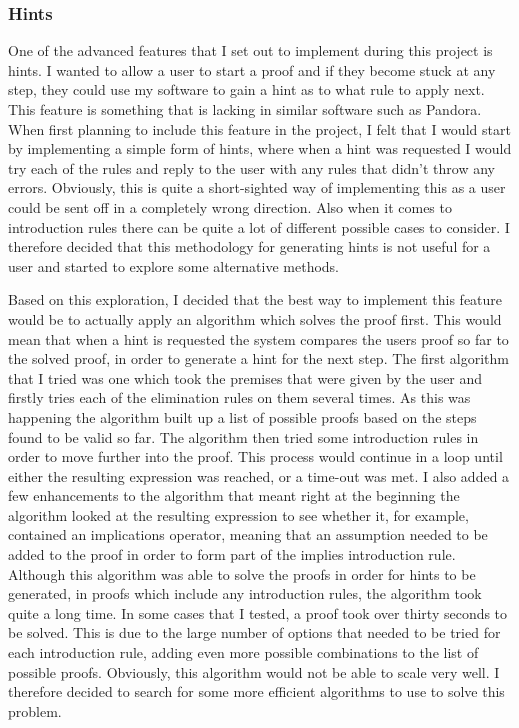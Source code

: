 \subsubsection{Hints \label{hints}}

One of the advanced features that I set out to implement during this project is hints. I wanted to allow a user to start a proof and if they become stuck at any step, they could use my software to gain a hint as to what rule to apply next. This feature is something that is lacking in similar software such as Pandora. When first planning to include this feature in the project,  I felt that I would start by implementing a simple form of hints, where when a hint was requested I would try each of the rules and reply to the user with any rules that didn't throw any errors. Obviously, this is quite a short-sighted way of implementing this as a user could be sent off in a completely wrong direction. Also when it comes to introduction rules there can be quite a lot of different possible cases to consider. I therefore decided that this methodology for generating hints is not useful for a user and started to explore some alternative methods.

Based on this exploration, I decided that the best way to implement this feature would be to actually apply an algorithm which solves the proof first. This would mean that when a hint is requested the system compares the users proof so far to the solved proof, in order to generate a hint for the next step. The first algorithm that I tried was one which took the premises that were given by the user and firstly tries each of the elimination rules on them several times. As this was happening the algorithm built up a list of possible proofs based on the steps found to be valid so far. The algorithm then tried some introduction rules in order to move further into the proof. This process would continue in a loop until either the resulting expression was reached, or a time-out was met. I also added a few enhancements to the algorithm that meant right at the beginning the algorithm looked at the resulting expression to see whether it, for example, contained an implications operator, meaning that an assumption needed to be added to the proof in order to form part of the implies introduction rule. Although this algorithm was able to solve the proofs in order for hints to be generated, in proofs which include any introduction rules, the algorithm took quite a long time. In some cases that I tested, a proof took over thirty seconds to be solved. This is due to the large number of options that needed to be tried for each introduction rule, adding even more possible combinations to the list of possible proofs. Obviously, this algorithm would not be able to scale very well. I therefore decided to search for some more efficient algorithms to use to solve this problem.


